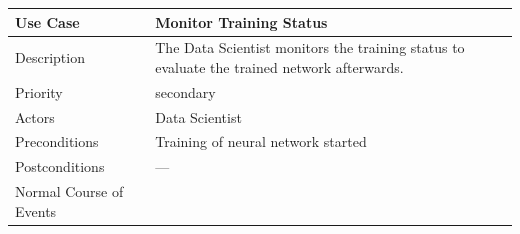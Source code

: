 \begin{longtable}[]{@{}ll@{}}
\toprule
\begin{minipage}[b]{0.27\columnwidth}\raggedright\strut
\textbf{Use Case}\strut
\end{minipage} & \begin{minipage}[b]{0.68\columnwidth}\raggedright\strut
\textbf{Monitor Training Status}\strut
\end{minipage}\tabularnewline
\midrule
\endhead
\begin{minipage}[t]{0.27\columnwidth}\raggedright\strut
Description\strut
\end{minipage} & \begin{minipage}[t]{0.68\columnwidth}\raggedright\strut
The Data Scientist monitors the training status to evaluate the trained
network afterwards.\strut
\end{minipage}\tabularnewline
\begin{minipage}[t]{0.27\columnwidth}\raggedright\strut
Priority\strut
\end{minipage} & \begin{minipage}[t]{0.68\columnwidth}\raggedright\strut
secondary\strut
\end{minipage}\tabularnewline
\begin{minipage}[t]{0.27\columnwidth}\raggedright\strut
Actors\strut
\end{minipage} & \begin{minipage}[t]{0.68\columnwidth}\raggedright\strut
Data Scientist\strut
\end{minipage}\tabularnewline
\begin{minipage}[t]{0.27\columnwidth}\raggedright\strut
Preconditions\strut
\end{minipage} & \begin{minipage}[t]{0.68\columnwidth}\raggedright\strut
Training of neural network started\strut
\end{minipage}\tabularnewline
\begin{minipage}[t]{0.27\columnwidth}\raggedright\strut
Postconditions\strut
\end{minipage} & \begin{minipage}[t]{0.68\columnwidth}\raggedright\strut
---\strut
\end{minipage}\tabularnewline
\begin{minipage}[t]{0.27\columnwidth}\raggedright\strut
Normal Course of Events\strut
\end{minipage} & \begin{minipage}[t]{0.68\columnwidth}\raggedright\strut

\end{minipage}
\end{longtable}
